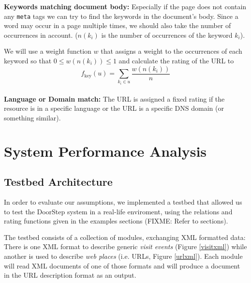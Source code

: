 \documentclass[a4paper]{danarticle}
\begin{document}
    \textbf{Keywords matching document body:} Especially if the page does not
    contain any \verb$meta$ tags we can try to find the keywords in the
    document's body. Since a word may occur in a page multiple times, we should
    also take the number of occurrences in account. ($ n(k_i) $ is the number of
    occurrences of the keyword $ k_i $).
    
    We will use a weight function $ w $ that assigns a weight to the occurrences
    of each keyword so that $ 0 \leq w(n(k_i)) \leq 1 $ and calculate the
    rating of the URL to
    \[
      f_{\mbox{key}}(u) = \sum_{k_i \in u} \frac{w(n(k_i))}{n}
    \]
    \\
    
    \textbf{Language or Domain match:} The URL is assigned a fixed
    rating if the resource is in a specific language or the URL is a
    specific DNS domain (or something similar).
  \section{System Performance Analysis}
    \subsection{Testbed Architecture}
      In order to evaluate our assumptions, we implemented a testbed that 
      allowed us to test the DoorStep system in a real-life enviroment, using 
      the relations and rating functions given in the examples sections (FIXME: 
      Refer to sections).
      
      The testbed consists of a collection of modules, exchanging XML formatted 
      data: There is one XML format to describe generic \textit{visit events} 
      (Figure \ref{visitxml}) while another is used to describe \textit{web 
      places} (i.e. URLs, Figure \ref{urlxml}). Each module will read XML 
      documents of one of those formats and will produce a document in the URL 
      description format as an output.
      
\end{document}
